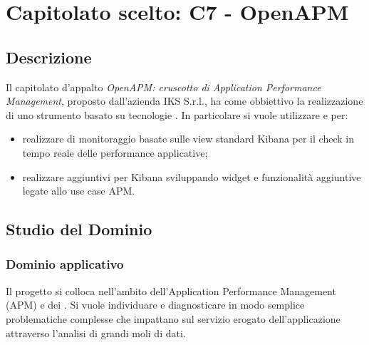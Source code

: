 \newpage
\section{Capitolato scelto: C7 - OpenAPM}
	\subsection{Descrizione}
	Il capitolato d'appalto \emph{OpenAPM: cruscotto di Application Performance Management},  proposto dall'azienda IKS S.r.l., ha come obbiettivo la realizzazione di uno strumento  basato su tecnologie . In particolare si vuole utilizzare  e  per:
	\begin{itemize}
		\item realizzare  di monitoraggio  basate sulle view standard Kibana per il check in tempo reale delle performance applicative;
		\item realizzare  aggiuntivi per Kibana sviluppando widget e funzionalità aggiuntive legate allo use case APM. 
	\end{itemize}
	
	\subsection{Studio del Dominio}
		\subsubsection{Dominio applicativo}
		Il progetto si colloca nell'ambito dell'Application Performance Management (APM) e dei . Si vuole individuare e diagnosticare in modo semplice problematiche complesse che impattano sul servizio erogato dell'applicazione attraverso l'analisi di grandi moli di dati.
